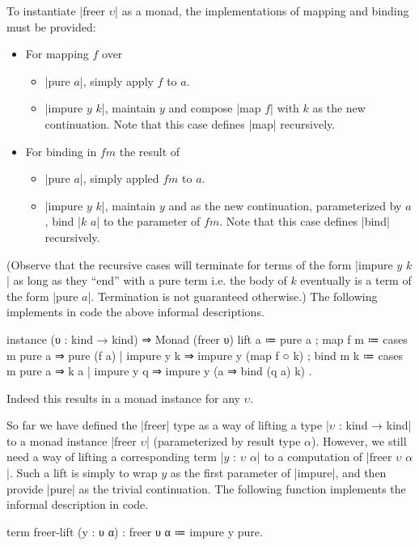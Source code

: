 To instantiate \code|freer $υ$| as a monad, the implementations of mapping and binding must be provided:
\begin{itemize}
  \item For mapping $f$ over
  \begin{itemize}
    \item \code|pure $a$|, simply apply $f$ to $a$.
    \item \code|impure $y$ $k$|, maintain $y$ and compose \code|map $f$| with $k$ as the new continuation.
        Note that this case defines \code|map| recursively.
  \end{itemize}

  \item For binding in $fm$ the result of
  \begin{itemize}
    \item \code|pure $a$|, simply appled $fm$ to $a$.
    \item \code|impure $y$ $k$|, maintain $y$ and as the new continuation, parameterized by $a$, bind \code|$k$ $a$| to the parameter of $fm$.
        Note that this case defines \code|bind| recursively.
  \end{itemize}
\end{itemize}
(Observe that the recursive cases will terminate for terms of the form \code|impure $y$ $k$| as long as they ``end'' with a pure term i.e. the body of $k$ eventually is a term of the form \code|pure $a$|.
Termination is not guaranteed otherwise.)
The following implements in code the above informal descriptions.
\begin{program}[caption={Monad instance of \code|freer|}]
instance (υ : kind → kind) ⇒ Monad (freer υ)
  { lift   a ≔ pure a
  ; map  f m ≔ cases m
                  { pure   a   ⇒ pure (f a)
                  | impure y k ⇒ impure y (map f ○ k) }
  ; bind m k ≔ cases m
                  { pure   a   ⇒ k a
                  | impure y q ⇒ impure y (a ⇒ bind (q a) k) } }.
\end{program}
Indeed this results in a monad instance for any $υ$.

So far we have defined the \code|freer| type as a way of lifting a type \code|$υ$ : kind → kind| to a monad instance \code|freer $υ$| (parameterized by result type $α$).
However, we still need a way of lifting a corresponding term \code|$y$ : $υ$ $α$| to a computation of \code|freer $υ$ $α$|.
Such a lift is simply to wrap $y$ as the first parameter of \code|impure|, and then provide \code|pure| as the trivial continuation.
The following function implements the informal description in code.
\begin{program}
term freer-lift (y : υ α) : freer υ α ≔ impure y pure.
\end{program}

